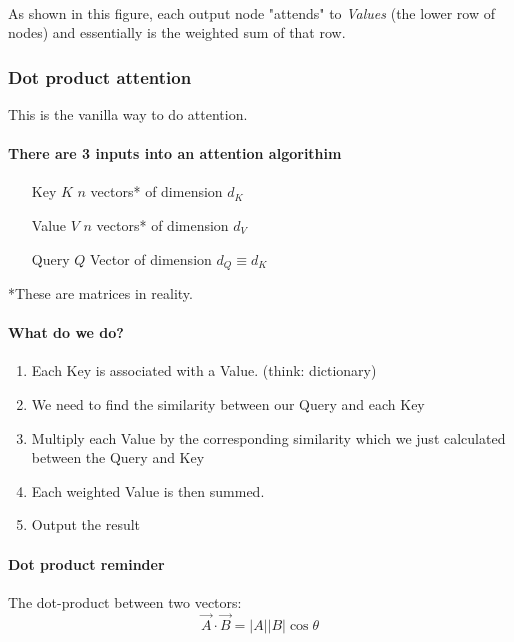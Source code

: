 \documentclass{article}
\begin{document}
    \paragraph{} As shown in this figure, each output node "attends" to \emph{Values} (the lower row of nodes) and essentially is the weighted sum of that row.  

    \subsubsection{Dot product attention}
    This is the vanilla way to do attention.

    \paragraph{There are 3 inputs into an attention algorithim}
    \begin{enumerate}
        \item[Key $K$] $n$ vectors* of dimension $d_K$ 
        \item[Value $V$] $n$ vectors* of dimension $d_V$ 
        \item[Query $Q$] Vector of dimension $d_Q \equiv d_K$
    \end{enumerate}
    *These are matrices in reality.

    \paragraph{What do we do?} 
    \begin{enumerate}
        \item Each Key is associated with a Value. (think: dictionary)
        \item We need to find the similarity between our Query and each Key
        \item Multiply each Value by the corresponding similarity which we just calculated between the Query and Key
        \item Each weighted Value is then summed.
        \item Output the result
    \end{enumerate}

    \paragraph{Dot product reminder} The dot-product between two vectors: 
    $$\vec{A} \cdot \vec{B} = |A||B|\cos{\theta}$$
    
\end{document}
